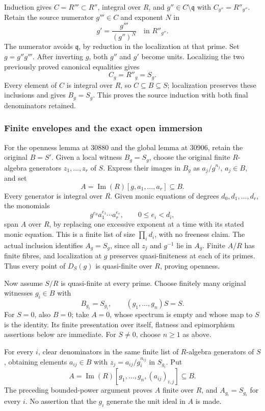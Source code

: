 Induction gives \(C=R'''\subset R''\), integral over \(R\), and \(g''\in C\setminus\mathfrak q\) with \(C_{g''}=R''_{g''}\). Retain the source numerator \(g'''\in C\) and exponent \(N\) in \[
 g'=\frac{g'''}{(g'')^N}\quad\text{in }R''_{g''}.
\] The numerator avoids \(\mathfrak q\), by reduction in the localization at that prime. Set \(g=g''g'''\). After inverting \(g\), both \(g''\) and \(g'\) become units. Localizing the two previously proved canonical equalities gives \[
 C_g=R''_g=S_g.
\] Every element of \(C\) is integral over \(R\), so \(C\subseteq B\subseteq S\); localization preserves these inclusions and gives \(B_g=S_g\). This proves the source induction with both final denominators retained.

\subsubsection{Finite envelopes and the exact open immersion}\label{algebra-proof-032-finite-envelopes-and-the-exact-open-immersion}

For the openness lemma at 30880 and the global lemma at 30906, retain the original \(B=S'\). Given a local witness \(B_g=S_g\), choose the original finite \(R\)-algebra generators \(z_1,\ldots,z_r\) of \(S\). Express their images in \(B_g\) as \(a_j/g^{n_j}\), \(a_j\in B\), and set \[
 A=\operatorname{Im}(R)[g,a_1,\ldots,a_r]\subseteq B.
\] Every generator is integral over \(R\). Given monic equations of degrees \(d_0,d_1,\ldots,d_r\), the monomials \[
 g^{e_0}a_1^{e_1}\cdots a_r^{e_r},
 \qquad 0\leq e_i<d_i,
\] span \(A\) over \(R\), by replacing one excessive exponent at a time with its stated monic equation. This is a finite list of size \(\prod_i d_i\), with no freeness claim. The actual inclusion identifies \(A_g=S_g\), since all \(z_j\) and \(g^{-1}\) lie in \(A_g\). Finite \(A/R\) has finite fibres, and localization at \(g\) preserves quasi-finiteness at each of its primes. Thus every point of \(D_S(g)\) is quasi-finite over \(R\), proving openness.

Now assume \(S/R\) is quasi-finite at every prime. Choose finitely many original witnesses \(g_i\in B\) with \[
 B_{g_i}=S_{g_i},\qquad (g_1,\ldots,g_n)S=S.
\] For \(S=0\), also \(B=0\); take \(A=0\), whose spectrum is empty and whose map to \(S\) is the identity. Its finite presentation over itself, flatness and epimorphism assertions below are immediate. For \(S\ne0\), choose \(n\geq1\) as above.

For every \(i\), clear denominators in the same finite list of \(R\)-algebra generators of \(S\), obtaining elements \(a_{ij}\in B\) with \(z_j=a_{ij}/g_i^{n_{ij}}\) in \(S_{g_i}\). Put \[
 A=\operatorname{Im}(R)[g_1,\ldots,g_n,(a_{ij})_{i,j}]\subseteq B.
\] The preceding bounded-power argument proves \(A\) finite over \(R\), and \(A_{g_i}=S_{g_i}\) for every \(i\). No assertion that the \(g_i\) generate the unit ideal in \(A\) is made.

